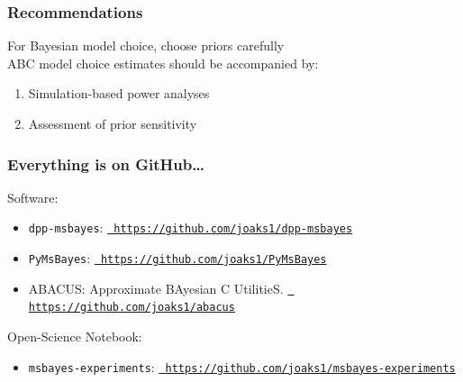 \begin{frame}
    \frametitle{Recommendations}
    For Bayesian model choice, choose priors carefully\\
    \bigskip
    ABC model choice estimates should be accompanied by:
    \begin{enumerate}
        \item Simulation-based power analyses
        \item Assessment of prior sensitivity
    \end{enumerate}
\end{frame}


\begin{frame}
    \frametitle{Everything is on GitHub\ldots}
    Software:\\
    \begin{itemize}
        \item \texttt{dpp-msbayes}:
            \href{https://github.com/joaks1/dpp-msbayes}{\tt
            https://github.com/joaks1/dpp-msbayes}

        \item \texttt{PyMsBayes}:
            \href{https://github.com/joaks1/PyMsBayes}{\tt
            https://github.com/joaks1/PyMsBayes}

        \item ABACUS: Approximate BAyesian C UtilitieS.
            \href{https://github.com/joaks1/abacus}{\tt
            https://github.com/joaks1/abacus}
    \end{itemize}

    \medskip
    Open-Science Notebook:\\
    \begin{itemize}
        \item \texttt{msbayes-experiments}:
            \href{https://github.com/joaks1/msbayes-experiments}{\tt
            https://github.com/joaks1/msbayes-experiments}
    \end{itemize}
\end{frame}


